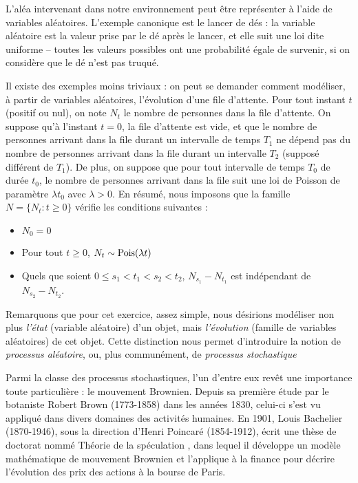 
L'aléa intervenant dans notre environnement peut être représenter à
l'aide de variables aléatoires. L'exemple canonique est le lancer de
dés : la variable aléatoire est la valeur prise par le dé après le
lancer, et elle suit une loi dite uniforme -- toutes les valeurs
possibles ont une probabilité égale de survenir, si on considère que
le dé n'est pas truqué.

Il existe des exemples moins triviaux : on peut se demander comment
modéliser, à partir de variables aléatoires, l'évolution d'une file
d'attente. Pour tout instant $t$ (positif ou nul), on note $N_t$ le
nombre de personnes dans la file d'attente. On suppose qu'à l'instant
$t=0$, la file d'attente est vide, et que le nombre de personnes
arrivant dans la file durant un intervalle de temps $T_1$ ne dépend
pas du nombre de personnes arrivant dans la file durant un intervalle
$T_2$ (supposé différent de $T_1$). De plus, on suppose que pour tout
intervalle de temps $T_0$ de durée $t_0$, le nombre de personnes
arrivant dans la file suit une loi de Poisson de paramètre $\lambda
t_0$ avec $\lambda>0$. En résumé, nous imposons que la famille
$N=\{N_t:t\geq 0\}$ vérifie les conditions suivantes :
\begin{itemize}
\item $N_0 = 0$
\item Pour tout $t\geq 0$, $N_t \sim \operatorname{Pois}(\lambda t)$
\item Quels que soient $0\leq s_1<t_1<s_2<t_2$, $N_{s_1} - N_{t_1}$
  est indépendant de $N_{s_2} - N_{t_2}$.
\end{itemize}
Remarquons que pour cet exercice, assez simple, nous désirions
modéliser non plus \emph{l'état} (variable aléatoire) d'un objet, mais
\emph{l'évolution} (famille de variables aléatoires) de cet
objet. Cette distinction nous permet d'introduire la notion de
\emph{processus aléatoire}, ou, plus communément, de \emph{processus
  stochastique}

Parmi la classe des processus stochastiques, l'un d'entre eux revêt
une importance toute particulière : le mouvement Brownien. Depuis sa
première étude par le botaniste Robert Brown (1773-1858) dans les
années 1830, celui-ci s'est vu appliqué dans divers domaines des
activités humaines. En 1901, Louis Bachelier (1870-1946), sous la
direction d'Henri Poincaré (1854-1912), écrit une thèse de doctorat
nommé \og Théorie de la spéculation \fg{}, dans lequel il développe un
modèle mathématique de mouvement Brownien et l'applique à la finance
pour décrire l'évolution des prix des actions à la bourse de
Paris.

